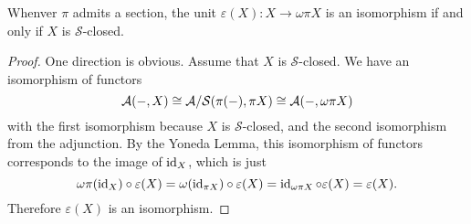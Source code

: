 \documentclass[dissertation.tex]{subfiles}
\begin{document}
\begin{proposition}
  Whenver $\pi$ admits a section, the unit $\varepsilon(X) \colon X \to \omega\pi{X}$ is an isomorphism if and only if $X$ is $\mathcal{S}$-closed.
\end{proposition}

\begin{proof}
  One direction is obvious.
  Assume that $X$ is $\mathcal{S}$-closed.
  We have an isomorphism of functors
  $$\mathcal{A}(-, X) \cong \mathcal{A}/\mathcal{S}(\pi(-), \pi{X}) \cong \mathcal{A}(-, \omega\pi{X})$$
  with the first isomorphism because $X$ is $\mathcal{S}$-closed, and the second isomorphism from the adjunction.
  By the Yoneda Lemma, this isomorphism of functors corresponds to the image of $\operatorname{id}_X$, which is just
  $$\omega\pi({\operatorname{id}_X}) \circ \varepsilon(X) =
  \omega(\operatorname{id}_{\pi{X}}) \circ \varepsilon(X) =
  \operatorname{id}_{\omega\pi{X}} \circ \varepsilon(X)
  = \varepsilon(X).$$
  Therefore $\varepsilon(X)$ is an isomorphism.
\end{proof}
\end{document}
